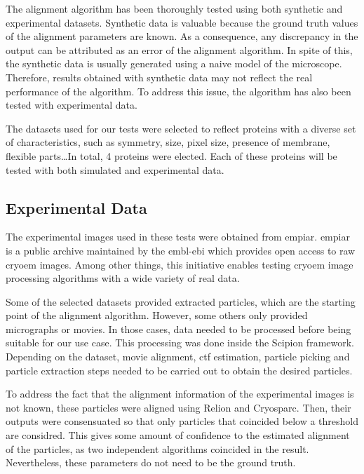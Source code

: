 \documentclass[../main.tex]{subfiles}
\begin{document}
The alignment algorithm has been thoroughly tested using both synthetic and experimental datasets. Synthetic data is valuable because the ground truth values of the alignment parameters are known. As a consequence, any discrepancy in the output can be attributed as an error of the alignment algorithm. In spite of this, the synthetic data is usually generated using a naive model of the microscope. Therefore, results obtained with synthetic data may not reflect the real performance of the algorithm. To address this issue, the algorithm has also been tested with experimental data.

The datasets used for our tests were selected to reflect proteins with a diverse set of characteristics, such as symmetry, size, pixel size, presence of membrane, flexible parts\dots In total, 4 proteins were elected. Each of these proteins will be tested with both simulated and experimental data.

\subsection{Experimental Data}
The experimental images used in these tests were obtained from \gls{empiar}. \Gls{empiar} is a public archive maintained by the \gls{embl}-\gls{ebi} which provides open access to raw \gls{cryoem} images\cite{iudin2022}. Among other things, this initiative enables testing \gls{cryoem} image processing algorithms with a wide variety of real data.

Some of the selected datasets provided extracted particles, which are the starting point of the alignment algorithm. However, some others only provided micrographs or movies. In those cases, data needed to be processed before being suitable for our use case. This processing was done inside the Scipion framework. Depending on the dataset, movie alignment, \gls{ctf} estimation, particle picking and particle extraction steps needed to be carried out to obtain the desired particles.

To address the fact that the alignment information of the experimental images is not known, these particles were aligned using Relion\cite{scheres2021} and Cryosparc\cite{cryosparc}. Then, their outputs were consensuated so that only particles that coincided below a threshold are considred. This gives some amount of confidence to the estimated alignment of the particles, as two independent algorithms coincided in the result. Nevertheless, these parameters do not need to be the ground truth.
\end{document}

